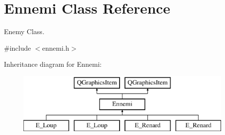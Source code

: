 \hypertarget{class_ennemi}{}\section{Ennemi Class Reference}
\label{class_ennemi}


Enemy Class.  




{\ttfamily \#include $<$ennemi.\+h$>$}

Inheritance diagram for Ennemi\+:\begin{figure}[H]
\begin{center}
\leavevmode
\includegraphics[height=3.000000cm]{class_ennemi}
\end{center}
\end{figure}
